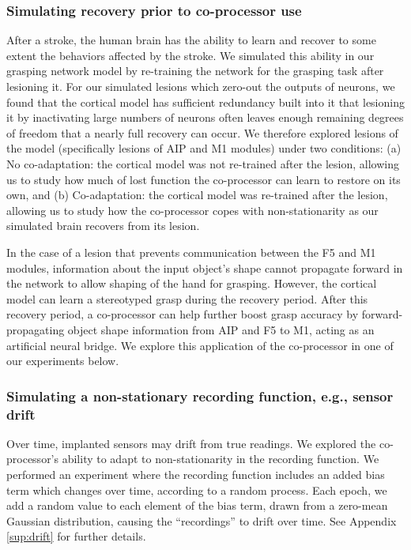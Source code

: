 \documentclass[12pt]{iopart}
\begin{document}
\subsubsection{Simulating recovery prior to co-processor use}
After a stroke, the human brain has the ability to learn and recover to some extent the behaviors
affected by the stroke. We simulated this ability in our grasping network model by re-training the 
network for the grasping task after lesioning it. For our simulated lesions which zero-out 
the outputs of neurons, we found that the cortical model has sufficient redundancy built into it that lesioning it by
inactivating large numbers of neurons often leaves enough remaining degrees of freedom that a
nearly full recovery can occur. We therefore explored lesions of  the model (specifically lesions of AIP and M1 modules)
under two conditions: (a) No co-adaptation: the cortical model was not re-trained after the lesion, allowing us to study
how much of lost function the co-processor can learn to restore on its own, and (b) Co-adaptation: the cortical model
was re-trained after the lesion, allowing us to study how the co-processor copes with non-stationarity as our simulated
brain recovers from its lesion.

In the case of a lesion that prevents communication between the F5 and M1 modules, information about
the input object's shape cannot propagate forward in the network to allow shaping of the hand for
grasping. However, the cortical model can learn a stereotyped grasp during the recovery period. After this recovery
period, a co-processor can help further boost grasp accuracy by forward-propagating object shape information
from AIP and F5 to M1, acting as an artificial neural bridge. We explore this application of the
co-processor in one of our experiments below.

\subsubsection{Simulating a non-stationary recording function, e.g., sensor drift}
Over time, implanted sensors may drift from true readings. We explored the co-processor's ability to adapt to
non-stationarity in the recording function. We performed an experiment where the recording function
includes an added bias term which changes over time, according to a random process. Each epoch, we
add a random value to each element of the bias term, drawn from a zero-mean Gaussian distribution, causing the
``recordings'' to drift over time. See Appendix \ref{sup:drift} for further details.
\end{document}
